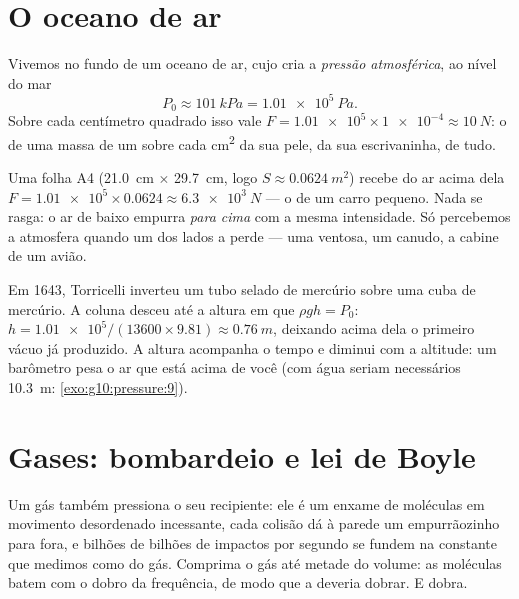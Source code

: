 \section{O oceano de ar}

\begin{definition}\label{def:g10:pressure:atmospheric}
Vivemos no fundo de um oceano de ar, cujo  cria a \emph{pressão
atmosférica}, ao nível do mar
\[
P_0 \approx \qty{101}{kPa} = \qty{1.01e5}{Pa}.
\]
Sobre cada centímetro quadrado isso vale
$F = \num{1.01e5} \times \num{1e-4} \approx \qty{10}{N}$: o  de uma
massa de um  sobre cada \unit{cm^2} da sua pele, da sua
escrivaninha, de tudo.
\end{definition}

\begin{example}\label{ex:g10:pressure:sheet}
Uma folha A4 (\qty{21.0}{cm} $\times$ \qty{29.7}{cm}, logo
$S \approx \qty{0.0624}{m^2}$) recebe do ar acima dela
$F = \num{1.01e5} \times 0.0624 \approx \qty{6.3e3}{N}$ --- o  de um
carro pequeno. Nada se rasga: o ar de baixo empurra \emph{para cima} com
a mesma intensidade. Só percebemos a atmosfera quando um dos lados a
perde --- uma ventosa, um canudo, a cabine de um avião.
\end{example}

\begin{remark}\label{rem:g10:pressure:torricelli}
Em 1643, Torricelli inverteu um tubo selado de mercúrio sobre uma cuba de
mercúrio. A coluna desceu até a altura em que $\rho g h = P_0$:
$h = \num{1.01e5}/(13600 \times 9.81) \approx \qty{0.76}{m}$, deixando
acima dela o primeiro vácuo já produzido. A altura acompanha o tempo e
diminui com a altitude: um barômetro pesa o ar que está acima de você
(com água seriam necessários \qty{10.3}{m}: \cref{exo:g10:pressure:9}).
\end{remark}

\section{Gases: bombardeio e lei de Boyle}

Um gás também pressiona o seu recipiente: ele é um enxame de moléculas em
movimento desordenado incessante, cada colisão dá à parede um empurrãozinho
para fora, e bilhões de bilhões de impactos por segundo se fundem na
 constante que medimos como  do gás. Comprima o gás até
metade do volume: as moléculas batem com o dobro da frequência, de modo
que a  deveria dobrar. E dobra.

